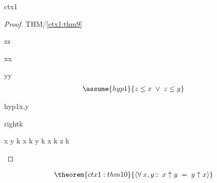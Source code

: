 \documentclass[12pt]{amsart}
\begin{document}
\begin{context}{ctx1}
\begin{proof}{THM/\ref{ctx1:thm9}}
	\begin{free:var}{z}{z}
	\begin{free:var}{x}{x}
	\begin{free:var}{y}{y}
	\begin{align}
	\assume{hyp1}{ z \le x \1\lor z\le y } 
	\end{align}
\begin{by:symmetry}{hyp1}{x,y}
\begin{indirect:inequality}{right}{\le}{k}
\begin{calculation}
		x \uparrow y \1\le k
	\hint{=}{ \eqref{ctx1:axm1} }
		x \le k \1\land y \le k
		x \le k
		z \le k
\end{calculation}
\end{indirect:inequality}
\end{by:symmetry}
	\end{free:var}
	\end{free:var}
	\end{free:var}
\end{proof}

\begin{align}
\theorem{ctx1:thm10}{ \qforall{x,y}{}{ x \uparrow y \1= y \uparrow x } }
\end{align}

\end{context}
\end{document}
